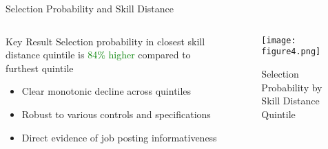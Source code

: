 \documentclass{beamer}
\begin{document}
\begin{frame}{Selection Probability and Skill Distance}
\begin{columns}
\begin{column}{0.45\textwidth}
\begin{block}{Key Result}
Selection probability in closest skill distance quintile is \textcolor{green}{84\% higher} compared to furthest quintile
\end{block}

\begin{itemize}
    \item Clear monotonic decline across quintiles
    \item Robust to various controls and specifications
    \item Direct evidence of job posting informativeness
\end{itemize}
\end{column}
\begin{column}{0.55\textwidth}
\begin{figure}
\centering
\texttt{[image: figure4.png]}
\caption*{Selection Probability by Skill Distance Quintile}
\end{figure}
\end{column}
\end{columns}
\end{frame}
\end{document}
